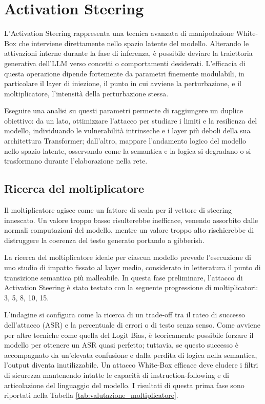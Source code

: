 \section{Activation Steering}
L'Activation Steering rappresenta una tecnica avanzata di manipolazione White-Box che interviene direttamente nello spazio latente del modello. Alterando le attivazioni interne durante la fase di inferenza, è possibile deviare la traiettoria generativa dell'LLM verso concetti o comportamenti desiderati. L'efficacia di questa operazione dipende fortemente da parametri finemente modulabili, in particolare il layer di iniezione, il punto in cui avviene la perturbazione, e il moltiplicatore, l'intensità della perturbazione stessa. 

Eseguire una analisi su questi parametri permette di raggiungere un duplice obiettivo: da un lato, ottimizzare l'attacco per studiare i limiti e la resilienza del modello, individuando le vulnerabilità intrinseche e i layer più deboli della sua architettura Transformer; dall'altro, mappare l'andamento logico del modello nello spazio latente, osservando come la semantica e la logica si degradano o si trasformano durante l'elaborazione nella rete.

\subsection{Ricerca del moltiplicatore}
Il moltiplicatore agisce come un fattore di scala per il vettore di steering innescato. Un valore troppo basso risulterebbe inefficace, venendo assorbito dalle normali computazioni del modello, mentre un valore troppo alto rischierebbe di distruggere la coerenza del testo generato portando a gibberish.

La ricerca del moltiplicatore ideale per ciascun modello prevede l'esecuzione di uno studio di impatto fissato al layer medio, considerato in letteratura il punto di transizione semantica più malleabile. In questa fase preliminare, l'attacco di Activation Steering è stato testato con la seguente progressione di moltiplicatori: 3, 5, 8, 10, 15.

L'indagine si configura come la ricerca di un trade-off tra il rateo di successo dell'attacco (ASR) e la percentuale di errori o di testo senza senso. Come avviene per altre tecniche come quella del Logit Bias, è teoricamente possibile forzare il modello per ottenere un ASR quasi perfetto; tuttavia, se questo successo è accompagnato da un'elevata confusione e dalla perdita di logica nella semantica, l'output diventa inutilizzabile. Un attacco White-Box efficace deve eludere i filtri di sicurezza mantenendo intatte le capacità di instruction-following e di articolazione del linguaggio del modello. I risultati di questa prima fase sono riportati nella Tabella \ref{tab:valutazione_moltiplicatore}.


